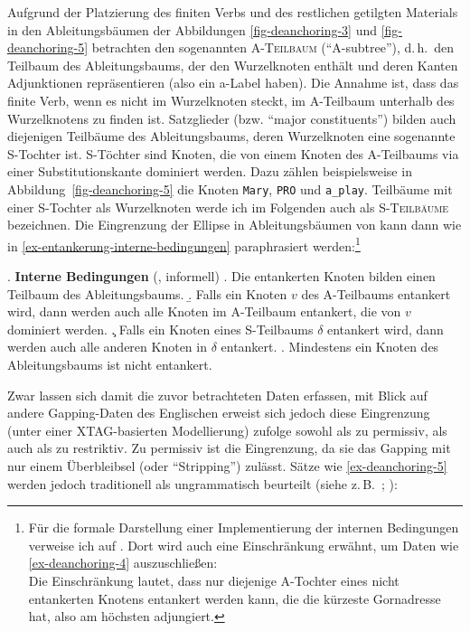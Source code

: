 Aufgrund der Platzierung des finiten Verbs und des restlichen getilgten Materials in den Ableitungsbäumen der Abbildungen \ref{fig-deanchoring-3} und \ref{fig-deanchoring-5} betrachten \cite{Lichte:Kallmeyer:10} den sogenannten \textsc{A-Teilbaum} ("`A-subtree"'), d.\,h.\ den Teilbaum des Ableitungsbaums, der den Wurzelknoten enthält und deren Kanten Adjunktionen repräsentieren (also ein {\sc a}-Label haben). Die Annahme ist, dass das finite Verb, wenn es nicht im Wurzelknoten steckt, im A-Teilbaum unterhalb des Wurzelknotens zu finden ist. Satzglieder (bzw. "`major constituents"') bilden auch diejenigen Teilbäume des Ableitungsbaums, deren Wurzelknoten eine sogenannte S-Tochter ist. S-Töchter sind Knoten, die von einem Knoten des A-Teilbaums via einer Substitutionskante dominiert werden. Dazu zählen beispielsweise in Abbildung~\ref{fig-deanchoring-5} die Knoten {\tt Mary}, {\tt PRO} und {\tt a\_play}.  Teilbäume mit einer S-Tochter als Wurzelknoten werde ich im Folgenden auch als \textsc{S-Teilbäume} bezeichnen. Die Eingrenzung der Ellipse in Ableitungsbäumen von \cite{Lichte:Kallmeyer:10} kann dann wie in \ref{ex-entankerung-interne-bedingungen} paraphrasiert werden:\footnote{Für die formale Darstellung einer Implementierung der internen Bedingungen verweise ich auf \cite{Lichte:Kallmeyer:10}. Dort wird auch eine Einschränkung erwähnt, um Daten wie \ref{ex-deanchoring-4} auszuschlie\ss en:\\
Die Einschränkung lautet, dass nur diejenige A-Tochter eines nicht entankerten Knotens entankert werden kann, die die kürzeste Gornadresse hat, also am höchsten adjungiert. 
} 

\ex. {\bf Interne Bedingungen} (\cite{Lichte:Kallmeyer:10}, informell) \label{ex-entankerung-interne-bedingungen}
\a. Die entankerten Knoten bilden einen Teilbaum des Ableitungsbaums.
\b. Falls ein Knoten $v$ des A-Teilbaums entankert wird, dann werden auch alle Knoten im A-Teilbaum entankert, die von $v$ dominiert werden.\label{ex-entankerung-interne-bedingungen-b}
\c. Falls ein Knoten eines S-Teilbaums $\delta$ entankert wird, dann werden auch alle anderen Knoten in $\delta$ entankert.
\e. Mindestens ein Knoten des Ableitungsbaums ist nicht entankert.

Zwar lassen sich damit die zuvor betrachteten Daten erfassen, mit Blick auf andere Gapping-Daten des Englischen erweist sich jedoch diese Eingrenzung (unter einer XTAG-basierten Modellierung) \cite{Lichte:Kallmeyer:10} zufolge sowohl als zu permissiv, als auch als zu restriktiv. Zu permissiv ist die Eingrenzung, da sie das Gapping mit nur einem Überbleibsel (oder "`Stripping"') zulässt. Sätze wie \ref{ex-deanchoring-5} werden jedoch traditionell als ungrammatisch beurteilt (siehe z.\,B.\ \citealt[27a]{Jackendoff:71}; \citealt[3]{Johnson:04}):

